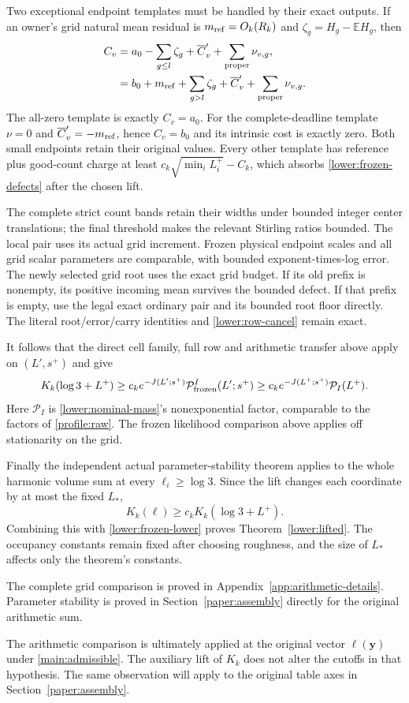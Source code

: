 Two exceptional endpoint templates must be handled by their exact
outputs.  If an owner's grid natural mean residual is
$m_{\rm ref}=O_k(R_k)$ and $\zeta_g=H_g-\mathbb EH_g$, then
\begin{align}
 C_v&=a_0-\sum_{g\leq l}\zeta_g+\overline C_v'
                                    +\sum_{\rm proper}\nu_{v,g},\notag\\
    &=b_0+m_{\rm ref}+\sum_{g>l}\zeta_g+\overline C_v'
                                    +\sum_{\rm proper}\nu_{v,g}.
 \label{lower:grid-row}
\end{align}
The all-zero template is exactly $C_v=a_0$.
For the complete-deadline template $\nu=0$ and
$\overline C_v'=-m_{\rm ref}$, hence $C_v=b_0$ and its intrinsic
cost is exactly zero.  Both small endpoints retain their original values.
Every other template has reference plus good-count charge at least
$c_k\sqrt{\min_iL_i^+}-C_k$, which absorbs
\eqref{lower:frozen-defects} after the chosen lift.

The complete strict count bands retain their widths under bounded
integer center translations; the final threshold makes the relevant
Stirling ratios bounded.  The local pair uses its actual grid increment.  Frozen physical endpoint scales and
all grid scalar parameters are comparable, with bounded
exponent-times-log error.  The newly selected grid root uses the exact
grid budget.  If its old prefix is nonempty, its positive incoming
mean survives the bounded defect.  If that prefix is empty, use the
legal exact ordinary pair and its bounded root floor directly.  The
literal root/error/carry identities and \eqref{lower:row-cancel} remain exact.

It follows that the direct cell family, full row and arithmetic
transfer above apply on $(L',s^+)$ and give
\begin{equation}
 K_k(\log3+L^+)\geq
 c_k e^{-J(L';s^+)}\mathcal P_{\rm frozen}^I(L';s^+)
 \geq c_k e^{-J(L^+;s^+)}\mathcal P_I(L^+).
 \label{lower:frozen-lower}
\end{equation}
Here $\mathcal P_I$ is \eqref{lower:nominal-mass}'s nonexponential
factor, comparable to the factors of \eqref{profile:raw}.  The frozen
likelihood comparison above applies off stationarity on the grid.

Finally the independent actual parameter-stability theorem applies
to the whole harmonic volume sum at every $\ell_i\geq\log3$.
Since the lift changes each coordinate by at most the fixed $L_*$,
\[
 K_k(\ell)\geq c_kK_k(\log3+L^+).
\]
Combining this with \eqref{lower:frozen-lower} proves
Theorem~\ref{lower:lifted}.  The occupancy constants remain fixed after
choosing roughness, and the size of $L_*$ affects only the theorem's
constants.

The complete grid comparison is proved in
Appendix~\ref{app:arithmetic-details}. Parameter stability is proved in
Section~\ref{paper:assembly} directly for the original arithmetic sum.

The arithmetic comparison is ultimately applied at the original vector
$\ell(\mathbf y)$ under \eqref{main:admissible}. The auxiliary lift of
$K_k$ does not alter the cutoffs in that hypothesis. The same observation
will apply to the original table axes in Section~\ref{paper:assembly}.
